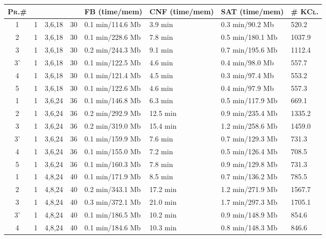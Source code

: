 \documentclass[a4paper]{article}
\theoremstyle{plain}
\theoremstyle{definition}
\begin{document}
\begin{table}[htbp]
\begin{center}
\begin{scriptsize}
\begin{tabular}{|c r r r l l l l|}
\hline
\textsc{Pr.\#} &  &   &    &  \textsc{FB} (time/mem)  &  \textsc{CNF} (time/mem) & \textsc{SAT} (time/mem) &  \textsc{\# KCl.} \\
\hline
1  &  1  &  3,6,18  &  30  &  0.1 min/114.6 Mb  &  3.9 min  &  0.3 min/90.2 Mb & 520.2 \\
2  &  1  &  3,6,18  &  30  &  0.1 min/228.6 Mb  &  7.8 min  &  0.5 min/180.1 Mb & 1037.9 \\
3  &  1  &  3,6,18  &  30  &  0.2 min/244.3 Mb  &  9.1 min  &  0.7 min/195.6 Mb & 1112.4 \\
3'  &  1  &  3,6,18  &  30  &  0.1 min/122.5 Mb  &  4.6 min  &  0.4 min/98.0 Mb & 557.7 \\
4  &  1  &  3,6,18  &  30  &  0.1 min/121.4 Mb  &  4.5 min  &  0.3 min/97.4 Mb & 553.2 \\
5  &  1  &  3,6,18  &  30  &  0.1 min/122.6 Mb  &  4.6 min  &  0.4 min/97.9 Mb & 557.3 \\
\hline
1  &  1  &  3,6,24  &  36  &  0.1 min/146.8 Mb  &  6.3 min  &  0.5 min/117.9 Mb & 669.1 \\
2  &  1  &  3,6,24  &  36  &  0.2 min/292.9 Mb  &  12.5 min  &  0.9 min/235.4 Mb & 1335.2 \\
3  &  1  &  3,6,24  &  36  &  0.2 min/319.0 Mb  &  15.4 min  &  1.2 min/258.6 Mb & 1459.0 \\
3'  &  1  &  3,6,24  &  36  &  0.1 min/159.9 Mb  &  7.6 min  &  0.7 min/129.3 Mb & 731.3 \\
4  &  1  &  3,6,24  &  36  &  0.1 min/155.0 Mb  &  7.2 min  &  0.5 min/126.4 Mb & 708.5 \\
5  &  1  &  3,6,24  &  36  &  0.1 min/160.3 Mb  &  7.8 min  &  0.9 min/129.8 Mb & 731.3 \\
\hline
1  &  1  &  4,8,24  &  40  &  0.1 min/171.9 Mb  &  8.5 min  &  0.7 min/136.2 Mb & 785.5 \\
2  &  1  &  4,8,24  &  40  &  0.2 min/343.1 Mb  &  17.2 min  &  1.2 min/271.9 Mb & 1567.7 \\
3  &  1  &  4,8,24  &  40  &  0.3 min/372.1 Mb  &  21.0 min  &  1.7 min/297.3 Mb & 1705.1 \\
3'  &  1  &  4,8,24  &  40  &  0.1 min/186.5 Mb  &  10.2 min  &  0.9 min/148.9 Mb & 854.6 \\
4  &  1  &  4,8,24  &  40  &  0.1 min/184.6 Mb  &  10.3 min  &  0.8 min/148.3 Mb & 846.6 \\

\end{tabular}
\end{scriptsize}
\end{center}
\end{table}
\end{document}
